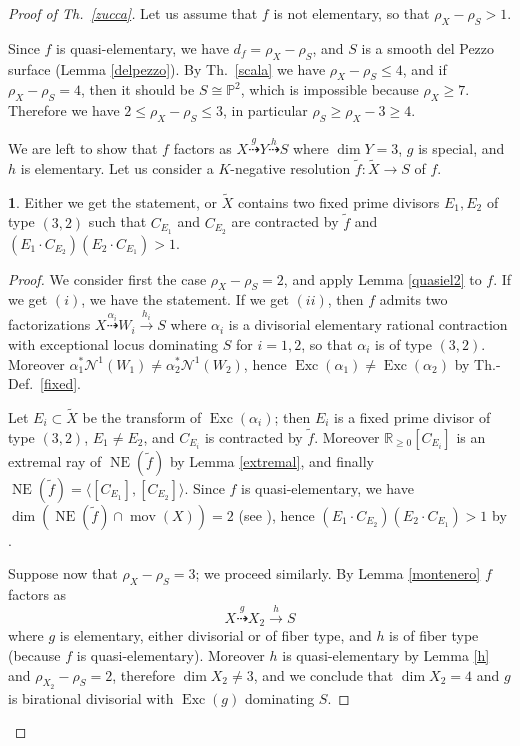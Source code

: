 \documentclass[a4paper,12pt]{amsart}
\theoremstyle{definition}
\newtheorem{prg}[thm]{}
\numberwithin{figure}{section}
\numberwithin{table}{section}
\newcommand{\w}{\widetilde}
\newcommand{\pr}{\mathbb{P}}
\newcommand{\R}{\mathbb{R}}
\newcommand{\Nu}{\mathcal{N}^1}
\newcommand{\NE}{\operatorname{NE}}
\newcommand{\Exc}{\operatorname{Exc}}
\newcommand{\mov}{\operatorname{mov}}
\begin{document}
\begin{proof}[Proof of Th.~\ref{zucca}]
 Let us assume that $f$ is not elementary, so that $\rho_X-\rho_S>1$.
  
Since $f$ is quasi-elementary, we have $d_f=\rho_X-\rho_S$, and $S$ is a smooth del Pezzo surface (Lemma \ref{delpezzo}). By Th.~\ref{scala} we have $\rho_X-\rho_S\leq 4$, and if 
$\rho_X-\rho_S=4$, then it should be $S\cong\pr^2$, which is impossible because $\rho_X\geq 7$. Therefore we have  $2\leq \rho_X-\rho_S\leq 3$, in particular $\rho_S\geq \rho_X-3\geq 4$. 

We are left to show that $f$ factors as $X\stackrel{g}{\dasharrow}Y\stackrel{h}{\dasharrow} S$ where $\dim Y=3$, $g$ is special, and $h$ is elementary.
Let us consider a $K$-negative resolution $\tilde{f}\colon\w{X}\to S$ of $f$.
\begin{prg}\label{2}
Either we get the statement, or $\w{X}$ contains two fixed prime divisors $E_1,E_2$ of type $(3,2)$ such that $C_{E_1}$ and $C_{E_2}$ are contracted by $\tilde{f}$ and $(E_1\cdot C_{E_2})(E_2\cdot C_{E_1})>1$.
\end{prg}
\begin{proof} 
  We consider first the case $\rho_X-\rho_S=2$, and apply Lemma \ref{quasiel2} to $f$. If we get $(i)$, we have the statement. If we get $(ii)$,
  then $f$ admits two factorizations $X\stackrel{\alpha_i}{\dasharrow} W_i\stackrel{h_i}{\to}S$ where  $\alpha_i$ is a divisorial elementary rational contraction with exceptional locus dominating $S$ for $i=1,2$, so that $\alpha_i$ is of type $(3,2)$. Moreover $\alpha_1^*\Nu(W_1)\neq
  \alpha_2^*\Nu(W_2)$, hence $\Exc(\alpha_1)\neq\Exc(\alpha_2)$ by Th.-Def.~\ref{fixed}.

 Let $E_i\subset \w{X}$ be the transform of $\Exc(\alpha_{i})$; then $E_i$ is
 a fixed prime divisor of type $(3,2)$, $E_1\neq E_2$, and $C_{E_i}$ is contracted by $\tilde{f}$. Moreover $\R_{\geq 0}[C_{E_i}]$ is an extremal ray of $\NE(\tilde{f})$
 by Lemma \ref{extremal}, and finally 
 $\NE(\tilde{f})=\langle [C_{E_1}],[C_{E_2}]\rangle$. Since $f$ is quasi-elementary, we have $\dim(\NE(\tilde{f})\cap\mov(X))=2$ (see \cite[Prop.~2.22]{eff}), hence
 $(E_1\cdot C_{E_2})(E_2\cdot C_{E_1})>1$ by \cite[Lemma 4.6(a)]{fibrations}.

\smallskip
  
  Suppose now that $\rho_X-\rho_S=3$; we proceed similarly. By Lemma \ref{montenero} $f$ factors as
  $$X\stackrel{g}{\dasharrow} X_2\stackrel{h}{\to} S$$ where $g$ is elementary, either divisorial or of fiber type, and $h$ is of fiber type (because $f$ is quasi-elementary). Moreover $h$ is quasi-elementary by Lemma \ref{h} and 
$\rho_{X_2}-\rho_S=2$, therefore $\dim X_2\neq 3$, and we conclude that $\dim X_2=4$ and 
  $g$ is birational divisorial with $\Exc(g)$ dominating  $S$. 


\end{proof}
\end{proof}
\end{document}
